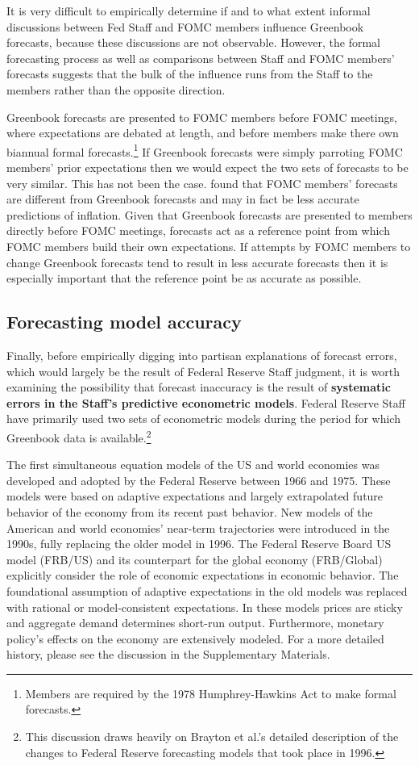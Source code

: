 \documentclass[a4paper]{article}
\begin{document}
It is very difficult to empirically determine if and to what extent informal discussions between Fed Staff and FOMC members influence Greenbook forecasts, because these discussions are not observable. However, the formal forecasting process as well as comparisons between Staff and FOMC members' forecasts suggests that the bulk of the influence runs from the Staff to the members rather than the opposite direction.

Greenbook forecasts are presented to FOMC members before FOMC meetings, where expectations are debated at length, and before members make there own biannual formal forecasts.\footnote{Members are required by the 1978 Humphrey-Hawkins Act to make formal forecasts.} If Greenbook forecasts were simply parroting FOMC members' prior expectations then we would expect the two sets of forecasts to be very similar. This has not been the case. \cite{RomerRomer2008} found that FOMC members' forecasts are different from Greenbook forecasts and may in fact be less accurate predictions of inflation. Given that Greenbook forecasts are presented to members directly before FOMC meetings, forecasts act as a reference point from which FOMC members build their own expectations. If attempts by FOMC members to change Greenbook forecasts tend to result in less accurate forecasts then it is especially important that the reference point be as accurate as possible.

\subsection{Forecasting model accuracy}

Finally, before empirically digging into partisan explanations of forecast errors, which would largely be the result of Federal Reserve Staff judgment, it is worth examining the possibility that forecast inaccuracy is the result of \textbf{systematic errors in the Staff's predictive econometric models}. Federal Reserve Staff have primarily used two sets of econometric models during the period for which Greenbook data is available.\footnote{This discussion draws heavily on Brayton et al.'s \citeyear{Brayton1997} detailed description of the changes to Federal Reserve forecasting models that took place in 1996.} 

The first simultaneous equation models of the US and world economies was developed and adopted by the Federal Reserve between 1966 and 1975. These models were based on adaptive expectations and largely extrapolated future behavior of the economy from its recent past behavior. New models of the American and world economies' near-term trajectories were introduced in the 1990s, fully replacing the older model in 1996. The Federal Reserve Board US model (FRB/US) and its counterpart for the global economy (FRB/Global) explicitly consider the role of economic expectations in economic behavior. The foundational assumption of adaptive expectations in the old models was replaced with rational or model-consistent expectations. In these models prices are sticky and aggregate demand determines short-run output. Furthermore, monetary policy's effects on the economy are extensively modeled. For a more detailed history, please see the discussion in the Supplementary Materials.
\end{document}
